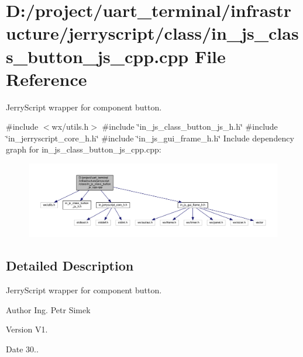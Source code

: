 \section{D\+:/project/uart\+\_\+terminal/infrastructure/jerryscript/class/in\+\_\+js\+\_\+class\+\_\+button\+\_\+js\+\_\+cpp.cpp File Reference}
\label{in__js__class__button__js__cpp_8cpp}


Jerry\+Script wrapper for component button.  


{\ttfamily \#include $<$wx/utils.\+h$>$}\newline
{\ttfamily \#include \char`\"{}in\+\_\+js\+\_\+class\+\_\+button\+\_\+js\+\_\+h.\+h\char`\"{}}\newline
{\ttfamily \#include \char`\"{}in\+\_\+jerryscript\+\_\+core\+\_\+h.\+h\char`\"{}}\newline
{\ttfamily \#include \char`\"{}in\+\_\+js\+\_\+gui\+\_\+frame\+\_\+h.\+h\char`\"{}}\newline
Include dependency graph for in\+\_\+js\+\_\+class\+\_\+button\+\_\+js\+\_\+cpp.\+cpp\+:\nopagebreak
\begin{figure}[H]
\begin{center}
\leavevmode
\includegraphics[width=350pt]{in__js__class__button__js__cpp_8cpp__incl}
\end{center}
\end{figure}


\subsection{Detailed Description}
Jerry\+Script wrapper for component button. 

\begin{DoxyAuthor}{Author}
Ing. Petr Simek 
\end{DoxyAuthor}
\begin{DoxyVersion}{Version}
V1. 
\end{DoxyVersion}
\begin{DoxyDate}{Date}
30.. 
\end{DoxyDate}
